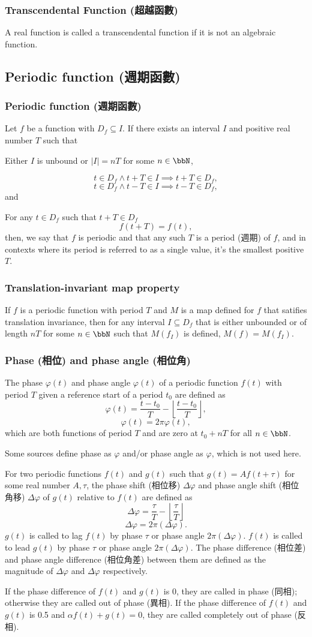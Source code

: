 \subsubsection{Transcendental Function (超越函數)}
A real function is called a transcendental function if it is not an algebraic function.
\subsection{Periodic function (週期函數)}
\subsubsection{Periodic function (週期函數)}
Let $f$ be a function with $D_f\subseteq I$. If there exists an interval $I$ and positive real number $T$ such that
\bit
\item Either $I$ is unbound or $|I|=nT$ for some $n\in\bbN$,
\item
\[t\in D_f\land t+T\in I\implies t+T\in D_f,\]
\[t\in D_f\land t-T\in I \implies t-T\in D_f,\]
and
\item For any $t\in D_f$ such that $t+T\in D_f$
\[f(t+T)=f(t),\]
\eit
then, we say that $f$ is periodic and that any such $T$ is a period (週期) of $f$, and in contexts where its period is referred to as a single value, it's the smallest positive $T$.
\subsubsection{Translation-invariant map property}
If $f$ is a periodic function with period $T$ and $M$ is a map defined for $f$ that satifies translation invariance, then for any interval $I\subseteq D_f$ that is either unbounded or of length $nT$ for some $n\in\bbN$ such that $M(f_I)$ is defined, $M(f)=M(f_I)$.
\subsubsection{Phase (相位) and phase angle (相位角)}
The phase $\varphi(t)$ and phase angle $\varphi(t)$ of a periodic function $f(t)$ with period $T$ given a reference start of a period $t_0$ are defined as
\[\varphi(t)=\frac{t-t_0}{T}-\left\lfloor\frac{t-t_0}{T}\right\rfloor,\]
\[\varphi(t)=2\pi\varphi(t),\]
which are both functions of period $T$ and are zero at $t_0+nT$ for all $n\in\bbN$.

Some sources define phase as $\varphi$ and/or phase angle as $\varphi$, which is not used here.

For two periodic functions $f(t)$ and $g(t)$ such that $g(t)=Af(t+\tau)$ for some real number $A,\tau$, the phase shift (相位移) $\Delta\varphi$ and phase angle shift (相位角移) $\Delta\varphi$ of $g(t)$ relative to $f(t)$ are defined as
\[\Delta\varphi=\frac{\tau}{T}-\left\lfloor\frac{\tau}{T}\right\rfloor\]
\[\Delta\varphi=2\pi(\Delta\varphi).\]
$g(t)$ is called to lag $f(t)$ by phase $\tau$ or phase angle $2\pi(\Delta\varphi)$. $f(t)$ is called to lead $g(t)$ by phase $\tau$ or phase angle $2\pi(\Delta\varphi)$. The phase difference (相位差) and phase angle difference (相位角差) between them are defined as the magnitude of $\Delta\varphi$ and $\Delta\varphi$ respectively.

If the phase difference of $f(t)$ and $g(t)$ is 0, they are called in phase (同相); otherwise they are called out of phase (異相). If the phase difference of $f(t)$ and $g(t)$ is 0.5 and $\alpha f(t)+g(t)=0$, they are called completely out of phase (反相).
